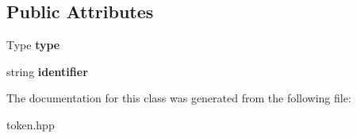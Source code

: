 \subsection*{Public Attributes}
\begin{DoxyCompactItemize}
\item 
\hypertarget{classpct_1_1_token_aa086c13ddb36a435dc42d1ff26e00418}{Type {\bfseries type}}\label{classpct_1_1_token_aa086c13ddb36a435dc42d1ff26e00418}

\item 
\hypertarget{classpct_1_1_token_ac3c3a9415583f87fde446ca1342fd77e}{string {\bfseries identifier}}\label{classpct_1_1_token_ac3c3a9415583f87fde446ca1342fd77e}

\end{DoxyCompactItemize}


The documentation for this class was generated from the following file\-:\begin{DoxyCompactItemize}
\item 
token.\-hpp\end{DoxyCompactItemize}
